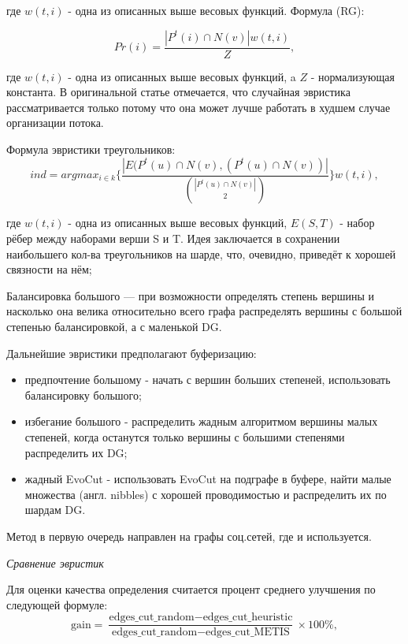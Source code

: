 где $w(t,i)$ - одна из описанных выше весовых функций.
Формула (RG):

\begin{equation*}
    Pr(i)=\frac{|P^t(i)\cap N(v)|w(t,i)}{Z},
\end{equation*}

где $w(t,i)$ - одна из описанных выше весовых функций, a $Z$ - нормализующая константа. В оригинальной статье отмечается, что случайная эвристика рассматривается только потому что она может лучше работать в худшем случае организации потока.

Формула эвристики треугольников:
    \begin{equation*}
        ind=arg max_{i\in k}\{\frac{|E(P^t(u)\cap N(v),(P^t(u)\cap N(v))|}{\binom{|P^t(u)\cap N(v)|}{2}}\}w(t,i),
    \end{equation*}
    
    где $w(t,i)$ - одна из описанных выше весовых функций, $E(S,T)$ - набор рёбер между наборами верши S и T. Идея заключается в сохранении наибольшего кол-ва треугольников на шарде, что, очевидно, приведёт к хорошей связности на нём;

Балансировка большого --- при возможности определять степень вершины и насколько она велика относительно всего графа распределять вершины с большой степенью балансировкой, а с маленькой DG. 

Дальнейшие эвристики предполагают буферизацию:
\begin{itemize}
    \item предпочтение большому - начать с вершин больших степеней, использовать балансировку большого;
    \item избегание большого - распределить жадным алгоритмом вершины малых степеней, когда останутся только вершины с большими степенями распределить их DG;
    \item жадный EvoCut - использовать EvoCut \cite{EvoCut} на подграфе в буфере, найти малые множества  (англ. nibbles) с хорошей проводимостью и распределить их по шардам DG.
\end{itemize}

Метод в первую очередь направлен на графы соц.сетей, где и используется.

\textit{Сравнение эвристик}

Для оценки качества определения считается процент среднего улучшения по следующей формуле:
\begin{equation*}
    \text{gain} = \frac{\text{edges\_cut\_random} - \text{edges\_cut\_heuristic}}{\text{edges\_cut\_random} - \text{edges\_cut\_METIS}} \times 100\%,
\end{equation*}

